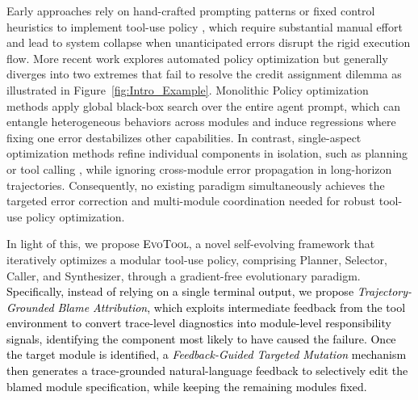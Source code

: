 \documentclass[11pt]{article}
\begin{document}
Early approaches rely on hand-crafted prompting patterns or fixed control heuristics to implement tool-use policy \cite{yao2022react, wang-etal-2023-plan}, which require substantial manual effort and lead to system collapse when unanticipated errors disrupt the rigid execution flow.
More recent work explores automated policy optimization \cite{gao2025survey} but generally diverges into two extremes that fail to resolve the credit assignment dilemma as illustrated in Figure~\ref{fig:Intro_Example}. Monolithic Policy optimization methods \cite{yang2023large,fernando2023promptbreeder} apply global black-box search over the entire agent prompt, which can entangle heterogeneous behaviors across modules and induce regressions where fixing one error destabilizes other capabilities. In contrast, single-aspect optimization methods refine individual components in isolation, such as planning or tool calling \cite{sun2023adaplanner,yuan2025easytool}, while ignoring cross-module error propagation in long-horizon trajectories.
Consequently, no existing paradigm simultaneously achieves the targeted error correction and multi-module coordination needed for robust tool-use policy optimization.








In light of this, we propose \textcolor{black}{\textsc{EvoTool}}, a novel self-evolving framework that iteratively optimizes a modular tool-use policy, comprising Planner, Selector, Caller, and Synthesizer, through a gradient-free evolutionary paradigm. 
\textcolor{black}{Specifically, instead of relying on a single terminal output, we propose \emph{Trajectory-Grounded Blame Attribution}, which exploits intermediate feedback from the tool environment to convert trace-level diagnostics into module-level responsibility signals, identifying the component most likely to have caused the failure. Once the target module is identified, a \emph{Feedback-Guided Targeted Mutation} mechanism then generates a trace-grounded natural-language feedback to selectively edit the blamed module specification, while keeping the remaining modules fixed.}
\end{document}
